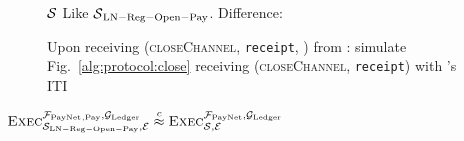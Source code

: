 \begin{figure}[H]
  \begin{simulatorbox}{$\mathcal{S}$}
    Like $\mathcal{S}{}_{\mathrm{LN - Reg - Open - Pay}}$. Difference:
    \begin{algorithmic}[1]
      \State Upon receiving (\textsc{closeChannel}, \texttt{receipt}, \alice)
      from \fpaynet:
      \Indent
        \State simulate Fig.~\ref{alg:protocol:close} receiving
        (\textsc{closeChannel}, \texttt{receipt}) with \alice's ITI
      \EndIndent
    \end{algorithmic}
  \end{simulatorbox}
  \caption{}
  \label{alg:sim:close}
\end{figure}

\begin{lemma}
  \label{lemma:close}
  $\textsc{Exec}^{\mathcal{F}_{\mathrm{PayNet}}{}_{\mathrm{, Pay}}, \mathcal{G}_{\mathrm{Ledger}}}_{\mathcal{S}_{\mathrm{LN
  - Reg - Open - Pay}}, \mathcal{E}} \overset{c}{\approx}
  \textsc{Exec}^{\mathcal{F}_{\mathrm{PayNet}}, \mathcal{G}_{\mathrm{Ledger}}}_{\mathcal{S}, \mathcal{E}}$
\end{lemma}

